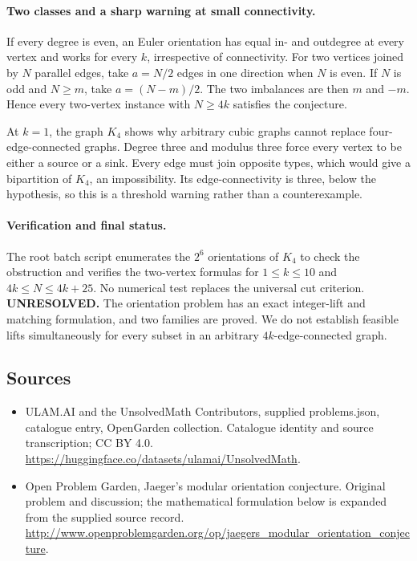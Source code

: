 \documentclass[11pt,a4paper]{article}
\begin{document}
\paragraph{Two classes and a sharp warning at small connectivity.}
If every degree is even, an Euler orientation has equal in- and outdegree
at every vertex and works for every $k$, irrespective of connectivity.
For two vertices joined by $N$ parallel edges, take $a=N/2$ edges in one
direction when $N$ is even. If $N$ is odd and $N\ge m$, take
$a=(N-m)/2$. The two imbalances are then $m$ and $-m$. Hence every
two-vertex instance with $N\ge4k$ satisfies the conjecture.

At $k=1$, the graph $K_4$ shows why arbitrary cubic graphs cannot replace
four-edge-connected graphs. Degree three and modulus three force every
vertex to be either a source or a sink. Every edge must join opposite
types, which would give a bipartition of $K_4$, an impossibility.
Its edge-connectivity is three, below the hypothesis, so this is a
threshold warning rather than a counterexample.

\paragraph{Verification and final status.}
The root batch script enumerates the $2^6$ orientations of $K_4$ to check
the obstruction and verifies the two-vertex formulas for $1\le k\le10$
and $4k\le N\le4k+25$. No numerical test replaces the universal cut
criterion. \textbf{UNRESOLVED.} The orientation problem has an exact
integer-lift and matching formulation, and two families are proved.
We do not establish feasible lifts simultaneously for every subset in
an arbitrary $4k$-edge-connected graph.

\subsection{Sources}
\begin{itemize}
\item[S1] ULAM.AI and the UnsolvedMath Contributors, supplied problems.json, catalogue entry, OpenGarden collection. Catalogue identity and source transcription; CC BY 4.0.
\url{https://huggingface.co/datasets/ulamai/UnsolvedMath}.
\item[S2] Open Problem Garden, Jaeger's modular orientation conjecture. Original problem and discussion; the mathematical formulation below is expanded from the supplied source record.
\url{http://www.openproblemgarden.org/op/jaegers_modular_orientation_conjecture}.

\end{itemize}
\end{document}
